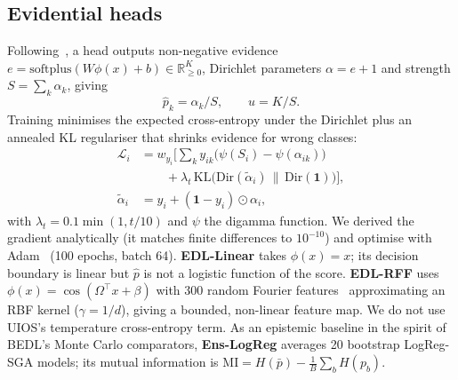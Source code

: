 \documentclass[conference]{IEEEtran}
\begin{document}
\subsection{Evidential heads}
Following~\cite{sensoy2018edl,wang2023uios}, a head outputs non-negative evidence $e=\mathrm{softplus}(W\phi(x)+b)\in\mathbb{R}_{\ge0}^K$, Dirichlet parameters $\alpha=e+1$ and strength $S=\sum_k\alpha_k$, giving
\begin{equation}
\hat p_k=\alpha_k/S,\qquad u=K/S .
\end{equation}
Training minimises the expected cross-entropy under the Dirichlet plus an annealed KL regulariser that shrinks evidence for wrong classes:
\begin{equation}
\begin{aligned}
\mathcal L_i &= w_{y_i}\Big[\sum_k y_{ik}\big(\psi(S_i)-\psi(\alpha_{ik})\big)\\
&\qquad +\lambda_t\,\mathrm{KL}\big(\mathrm{Dir}(\tilde\alpha_i)\,\|\,\mathrm{Dir}(\mathbf 1)\big)\Big],\\
\tilde\alpha_i &= y_i+(\mathbf 1-y_i)\odot\alpha_i,
\end{aligned}
\end{equation}
with $\lambda_t=0.1\min(1,t/10)$ and $\psi$ the digamma function. We derived the gradient analytically (it matches finite differences to $10^{-10}$) and optimise with Adam~\cite{kingma2015adam} (100 epochs, batch 64). \textbf{EDL-Linear} takes $\phi(x)=x$; its decision boundary is linear but $\hat p$ is not a logistic function of the score. \textbf{EDL-RFF} uses $\phi(x)=\cos(\Omega^\top x+\beta)$ with 300 random Fourier features~\cite{rahimi2007random} approximating an RBF kernel ($\gamma=1/d$), giving a bounded, non-linear feature map. We do not use UIOS's temperature cross-entropy term. As an epistemic baseline in the spirit of BEDL's Monte Carlo comparators, \textbf{Ens-LogReg} averages 20 bootstrap LogReg-SGA models; its mutual information is $\mathrm{MI}=H(\bar p)-\frac1B\sum_b H(p_b)$.
\end{document}
